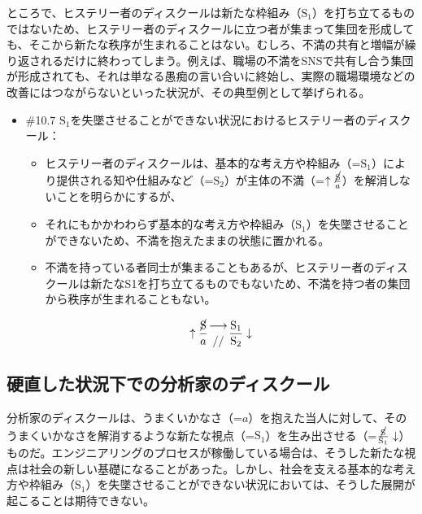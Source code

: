 ところで、ヒステリー者のディスクールは新たな枠組み（\(\textrm{S}_1\)）を打ち立てるものではないため、ヒステリー者のディスクールに立つ者が集まって集団を形成しても、そこから新たな秩序が生まれることはない。むしろ、不満の共有と増幅が繰り返されるだけに終わってしまう。例えば、職場の不満をSNSで共有し合う集団が形成されても、それは単なる愚痴の言い合いに終始し、実際の職場環境などの改善にはつながらないといった状況が、その典型例として挙げられる。

\begin{note}{}
  \begin{itemize}
    \tightlist
    \item{\#10.7} $\textrm{S}_1$を失墜させることができない状況におけるヒステリー者のディスクール：
      \begin{itemize}
        \tightlist
        \item ヒステリー者のディスクールは、基本的な考え方や枠組み（=$\textrm{S}_1$）により提供される知や仕組みなど（=$\textrm{S}_2$）が主体の不満（=$\uparrow\frac{\cancel{\textrm{S}}}{a}$）を解消しないことを明らかにするが、
        \item それにもかかわわらず基本的な考え方や枠組み（$\textrm{S}_1$）を失墜させることができないため、不満を抱えたままの状態に置かれる。
        \item 不満を持っている者同士が集まることもあるが、ヒステリー者のディスクールは新たなS1を打ち立てるものでもないため、不満を持つ者の集団から秩序が生まれることもない。
      \end{itemize}

$$
\uparrow\frac{\cancel{\textrm{S}}}{a}\genfrac{}{}{0pt}{}{\longrightarrow}{//}\frac{\mathrm{S_1}}{\mathrm{S_2}}\downarrow
$$
  \end{itemize}
\end{note}

\subsection{硬直した状況下での分析家のディスクール}\label{ux786cux76f4ux3057ux305fux72b6ux6cc1ux4e0bux3067ux306eux5206ux6790ux5bb6ux306eux30c7ux30a3ux30b9ux30afux30fcux30eb}

分析家のディスクールは、うまくいかなさ（=\(a\)）を抱えた当人に対して、そのうまくいかなさを解消するような新たな視点（=\(\textrm{S}_1\)）を生み出させる（=\(\frac{\cancel{\textrm{S}}}{\textrm{S}_1}\downarrow\)）ものだ。エンジニアリングのプロセスが稼働している場合は、そうした新たな視点は社会の新しい基礎になることがあった。しかし、社会を支える基本的な考え方や枠組み（\(\textrm{S}_1\)）を失墜させることができない状況においては、そうした展開が起こることは期待できない。

